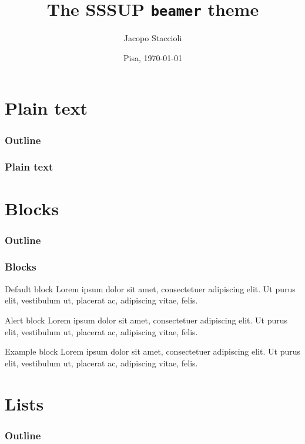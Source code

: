 \documentclass{beamer}
\title[The SSSUP \texttt{beamer} theme]{The SSSUP \texttt{beamer} theme}
\author[Jacopo Staccioli]{Jacopo Staccioli}
\institute{\href{mailto:j.staccioli@santannapisa.it}{\texttt{j.staccioli<at>santannapisa.it}}}
\date[\today]{Pisa, \today}
\begin{document}
\begin{frame}
\maketitle
\end{frame}

\section{\bfseries Plain text}

\begin{frame}
\frametitle{Outline}
\tableofcontents[currentsection]
\end{frame}

\begin{frame}
\frametitle{Plain text}
\lipsum[1]
\end{frame}

\section{\bfseries Blocks}

\begin{frame}
\frametitle{Outline}
\tableofcontents[currentsection]
\end{frame}

\begin{frame}
\frametitle{Blocks}
\begin{block}{Default block}
Lorem ipsum dolor sit amet, consectetuer adipiscing elit. Ut purus elit, vestibulum ut, placerat ac, adipiscing vitae, felis.
\end{block}
\begin{alertblock}{Alert block}
Lorem ipsum dolor sit amet, consectetuer adipiscing elit. Ut purus elit, vestibulum ut, placerat ac, adipiscing vitae, felis.
\end{alertblock}
\begin{exampleblock}{Example block}
Lorem ipsum dolor sit amet, consectetuer adipiscing elit. Ut purus elit, vestibulum ut, placerat ac, adipiscing vitae, felis.
\end{exampleblock}
\end{frame}

\section{\bfseries Lists}

\begin{frame}
\frametitle{Outline}
\tableofcontents[currentsection]
\end{frame}
\end{document}
